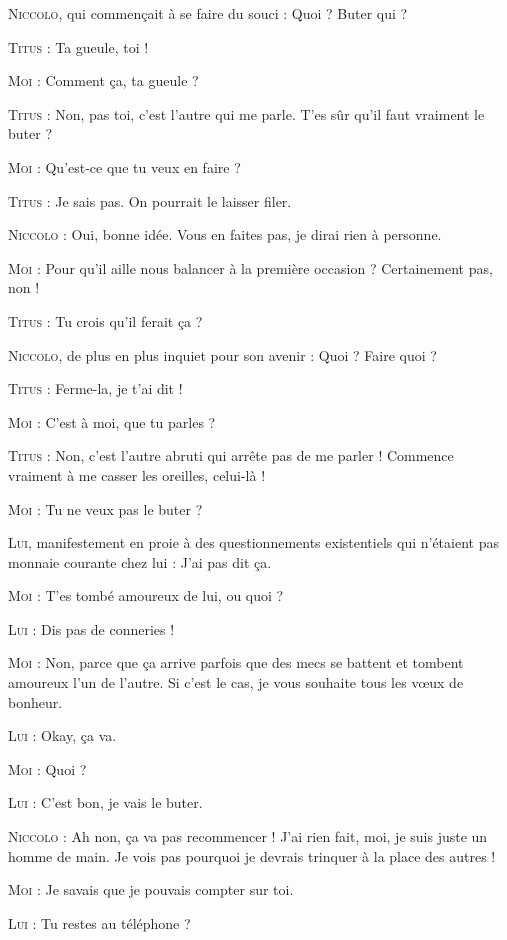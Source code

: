 \textsc{Niccolo}, qui commençait à se faire du souci : Quoi ? Buter qui ?

\textsc{Titus} : Ta gueule, toi !

\textsc{Moi} : Comment ça, ta gueule ?

\textsc{Titus} : Non, pas toi, c’est l’autre qui me parle. T’es sûr qu’il faut vraiment le buter ?

\textsc{Moi} : Qu’est-ce que tu veux en faire ?

\textsc{Titus} : Je sais pas. On pourrait le laisser filer.

\textsc{Niccolo} : Oui, bonne idée. Vous en faites pas, je dirai rien à personne.

\textsc{Moi} : Pour qu’il aille nous balancer à la première occasion ? Certainement pas, non !

\textsc{Titus} : Tu crois qu’il ferait ça ?

\textsc{Niccolo}, de plus en plus inquiet pour son avenir : Quoi ? Faire quoi ?

\textsc{Titus} : Ferme-la, je t’ai dit !

\textsc{Moi} : C’est à moi, que tu parles ?

\textsc{Titus} : Non, c’est l’autre abruti qui arrête pas de me parler ! Commence vraiment à me casser les oreilles, celui-là !

\textsc{Moi} : Tu ne veux pas le buter ?

\textsc{Lui}, manifestement en proie à des questionnements existentiels qui n’étaient pas monnaie courante chez lui : J’ai pas dit ça.

\textsc{Moi} : T’es tombé amoureux de lui, ou quoi ?

\textsc{Lui} : Dis pas de conneries !

\textsc{Moi} : Non, parce que ça arrive parfois que des mecs se battent et tombent amoureux l’un de l’autre. Si c’est le cas, je vous souhaite tous les vœux de bonheur.

\textsc{Lui} : Okay, ça va.

\textsc{Moi} : Quoi ?

\textsc{Lui} : C’est bon, je vais le buter.

\textsc{Niccolo} : Ah non, ça va pas recommencer ! J’ai rien fait, moi, je suis juste un homme de main. Je vois pas pourquoi je devrais trinquer à la place des autres !

\textsc{Moi} : Je savais que je pouvais compter sur toi.

\textsc{Lui} : Tu restes au téléphone ?

